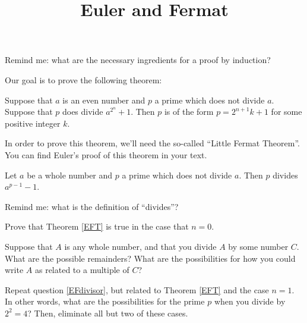 \documentclass[handout,nooutcomes]{ximera}
\title{Euler and Fermat}
\begin{document}
\begin{abstract}
    
\end{abstract}
\maketitle

\begin{question}
Remind me: what are the necessary ingredients for a proof by induction?
\end{question}

Our goal is to prove the following theorem: 
\begin{theorem}\label{EFT}
Suppose that $a$ is an even number and $p$ a prime which does not divide $a$.  Suppose that 
$p$ does divide $a^{2^n} + 1$.  Then $p$ is of the form $p = 2^{n+1}k + 1$ for some positive 
integer $k$.  
\end{theorem}

In order to prove this theorem, we'll need the so-called ``Little Fermat Theorem''.  You can 
find Euler's proof of this theorem in your text.
\begin{theorem}
Let $a$ be a whole number and $p$ a prime which does not divide $a$.  Then $p$ divides 
$a^{p-1} - 1$.
\end{theorem}

\begin{question}
Remind me: what is the definition of ``divides''?
\end{question}

\begin{question}
Prove that Theorem \ref{EFT} is true in the case that $n=0$.
\end{question}

\begin{question}\label{EFdivisor}
Suppose that $A$ is any whole number, and that you divide $A$ by some number $C$.  What 
are the possible remainders?  What are the possibilities for how you could write $A$ as 
related to a multiple of $C$?
\end{question}

\begin{question} \label{EFcases}
Repeat question \ref{EFdivisor}, but related to Theorem \ref{EFT} and the case $n=1$.  
In other words, what are the possibilities for the prime $p$ when you divide by $2^2 = 4$?  
Then, eliminate all but two of these cases.
\end{question}
\end{document}
